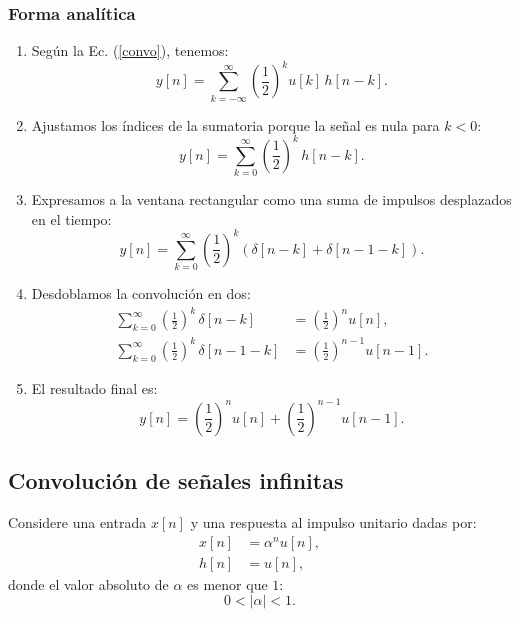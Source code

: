 \documentclass[11pt,a4paper,openany]{book}
\begin{document}
\subsubsection{Forma analítica}

\begin{enumerate}
	\item Según la Ec. (\ref{convo}), tenemos:
	\begin{equation}
		y[n] = \sum_{k=-\infty}^{\infty} \left( \frac{1}{2}\right)^k u[k] \, h[n-k].
	\end{equation}
	
	\item Ajustamos los índices de la sumatoria porque la señal es nula para $k < 0$:
	\begin{equation}
		y[n] = \sum_{k=0}^{\infty} \left( \frac{1}{2}\right)^k \, h[n-k].
	\end{equation}
	
	\item Expresamos a la ventana rectangular como una suma de impulsos desplazados en el tiempo:
	\begin{equation}
		y[n] = \sum_{k=0}^{\infty} \left( \frac{1}{2}\right)^k \left(\delta[n-k] + \delta[n-1-k] \right).
	\end{equation}
	
	\item Desdoblamos la convolución en dos:
	\begin{align}
		\sum_{k=0}^{\infty} \left( \frac{1}{2}\right)^k \, \delta[n-k] &= \left( \frac{1}{2}\right)^n u[n], \\
		\sum_{k=0}^{\infty} \left( \frac{1}{2}\right)^k \, \delta[n-1-k] &= \left( \frac{1}{2}\right)^{n-1} u[n-1].
	\end{align}
	
	\item El resultado final es:
	\begin{equation}
		y[n] = \left( \frac{1}{2}\right)^n u[n] + \left(\frac{1}{2}\right)^{n-1} u[n-1].
	\end{equation}
\end{enumerate}

\subsection{Convolución de señales infinitas}

Considere una entrada $x[n]$ y una respuesta al impulso unitario dadas por:
\begin{align}
	x[n] &= \alpha^n u[n], \\
	h[n] &= u[n],
\end{align}
donde el valor absoluto de $\alpha$ es menor que $1$:
\begin{equation}
	0 < |\alpha| < 1.
\end{equation}
\end{document}
